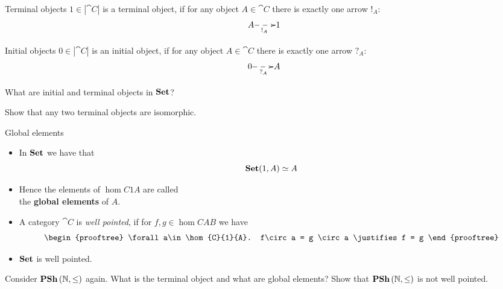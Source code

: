 \documentclass[handout]{beamer}
\newcommand{\ru}[2]{\vspace{1ex}
\begin{prooftree}
#1 \justifies #2
\end{prooftree}\vspace{1ex}}
\begin{document}
\begin{frame}

  
  \begin{block}{Terminal objects}
    $1\in|\cat{C}|$ is a terminal object, if for any object $A\in\cat{C}$
    there is exactly one arrow $!_A$:
    \[ \xymatrix@1{ A \ar@{-->}[r]_{!_A} & 1}\]
  \end{block}

  \begin{block}{Initial objects}
    $0\in|\cat{C}|$ is an initial object, if for any object $A\in\cat{C}$
    there is exactly one arrow $?_A$:
    \[ \xymatrix@1{ 0 \ar@{-->}[r]_{?_A} & A}\]
  \end{block}

  \begin{question}
    What are initial and terminal objects in $\mathbf{Set}$?
  \end{question}

  \begin{exercise}
    Show that any two terminal objects are isomorphic.
  \end{exercise}

\end{frame}

\begin{frame}{Global elements}

  \begin{itemize}
  \item In $\mathbf{Set}$ we have that
    \[ \mathbf{Set}(1,A) \simeq A \]

  \item Hence the elements of $\hom{C}{1}{A}$ are called \\
    the \textbf{global elements} of $A$.

  \item A category $\cat{C}$ is \emph{well pointed}, if for 
    $f,g \in\hom{C}{A}{B}$ we have
    \[\ru{\forall a\in \hom{C}{1}{A}. f\circ a = g \circ a}
    {f = g}\]

  \item $\mathbf{Set}$ is well pointed.

  \end{itemize}

  \begin{exercise}
    Consider $\mathbf{PSh}\,(\mathbb{N},\leq)$ again. What is the terminal
    object and what are global elements?
    Show that $\mathbf{PSh}\,(\mathbb{N},\leq)$ is not well pointed.
  \end{exercise}

\end{frame}
\end{document}
